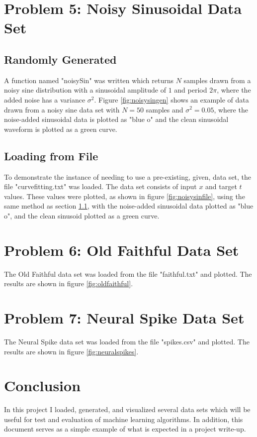 \documentclass[conference]{IEEEtran}
\begin{document}
\section{Problem 5: Noisy Sinusoidal Data Set}
\subsection{Randomly Generated}\label{section:randomgen}
A function named "noisySin" was written which returns $N$ samples drawn from a noisy sine distribution with a sinusoidal amplitude of $1$ and period $2\pi$, where the added noise has a variance $\sigma^2$. Figure \ref{fig:noisysingen} shows an example of data drawn from a noisy sine data set with $N=50$ samples and $\sigma^2=0.05$, where the noise-added sinusoidal data is plotted as "blue o" and the clean sinusoidal waveform is plotted as a green curve.

\subsection{Loading from File}
To demonstrate the instance of needing to use a pre-existing, given, data set, the file "curvefitting.txt" was loaded. The data set consists of input $x$ and target $t$ values. These values were plotted, as shown in figure \ref{fig:noisysinfile}, using the same method as section \ref{section:randomgen}, with the noise-added sinusoidal data plotted as "blue o", and the clean sinusoid plotted as a green curve.

\section{Problem 6: Old Faithful Data Set}
The Old Faithful data set was loaded from the file "faithful.txt" and plotted. The results are shown in figure \ref{fig:oldfaithful}.

\section{Problem 7: Neural Spike Data Set}
The Neural Spike data set was loaded from the file "spikes.csv" and plotted. The results are shown in figure \ref{fig:neuralspikes}.

\section{Conclusion}
In this project I loaded, generated, and visualized several data sets which will be useful for test and evaluation of machine learning algorithms. In addition, this document serves as a simple example of what is expected in a project write-up.
\end{document}
